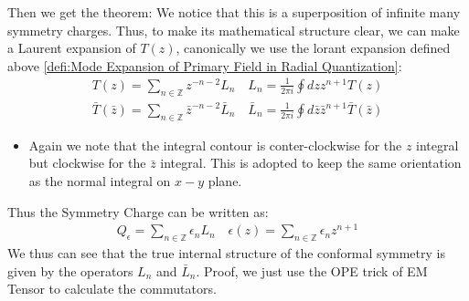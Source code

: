 Then we get the theorem:
We notice that this is a superposition of infinite many symmetry
charges. Thus, to make its mathematical structure clear, we can make
a Laurent expansion of $ T(z) $, canonically we use the lorant
expansion defined above \cref{defi:Mode Expansion of Primary Field in
Radial Quantization}:
\begin{align}
  T(z)=\sum_{n\in\mathbb{Z}}z^{-n-2}L_n\quad L_n=\frac{1}{2\pi
  i}\oint dzz^{n+1}T(z)\\
  \bar{T}(\bar{z})=\sum_{n\in\mathbb{Z}}\bar{z}^{-n-2}\bar{L}_n\quad\bar{L}_n=\frac{1}{2\pi
  i}\oint d\bar{z}\bar{z}^{n+1}\bar{T}(\bar{z})
\end{align}
\begin{itemize}
  \item Again we note that the integral contour is conter-clockwise
    for the $ z $ integral but clockwise for the $ \bar{z} $
    integral. This is adopted to keep the same orientation as the
    normal integral on $ x-y $ plane.
\end{itemize}
Thus the Symmetry Charge can be written as:
\begin{align}
  Q_\epsilon=\sum_{n\in\mathbb{Z}}\epsilon_nL_n \quad
  \epsilon(z)=\sum_{n\in\mathbb{Z}}\epsilon_nz^{n+1}
\end{align}
We thus can see that the true internal structure of the conformal
symmetry is given by the operators $ L_n $ and $ \bar{L}_n $.
Proof, we just use the OPE trick of EM Tensor to calculate the commutators.

